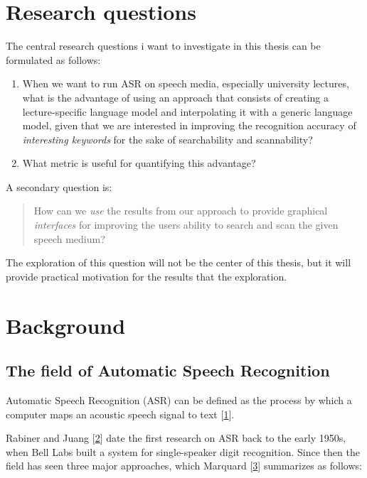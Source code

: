 \section{Research questions}\label{research-questions}

The central research questions i want to investigate in this thesis can
be formulated as follows:

\begin{enumerate}
\def\labelenumi{(\arabic{enumi})}
\item
  When we want to run ASR on speech media, especially university
  lectures, what is the advantage of using an approach that consists of
  creating a lecture-specific language model and interpolating it with a
  generic language model, given that we are interested in improving the
  recognition accuracy of \emph{interesting keywords} for the sake of
  searchability and scannability?
\item
  What metric is useful for quantifying this advantage?
\end{enumerate}

A secondary question is:

\begin{quote}
How can we \emph{use} the results from our approach to provide graphical
\emph{interfaces} for improving the users ability to search and scan the
given speech medium?
\end{quote}

The exploration of this question will not be the center of this thesis,
but it will provide practical motivation for the results that the
exploration.

\section{Background}\label{background}

\subsection{The field of Automatic Speech
Recognition}\label{the-field-of-automatic-speech-recognition}

Automatic Speech Recognition (ASR) can be defined as the process by
which a computer maps an acoustic speech signal to text
{[}\hyperref[ref-cmufaq]{1}{]}.

Rabiner and Juang {[}\hyperref[ref-rabiner]{2}{]} date the first
research on ASR back to the early 1950s, when Bell Labs built a system
for single-speaker digit recognition. Since then the field has seen
three major approaches, which Marquard {[}\hyperref[ref-marquard]{3}{]}
summarizes as follows:

